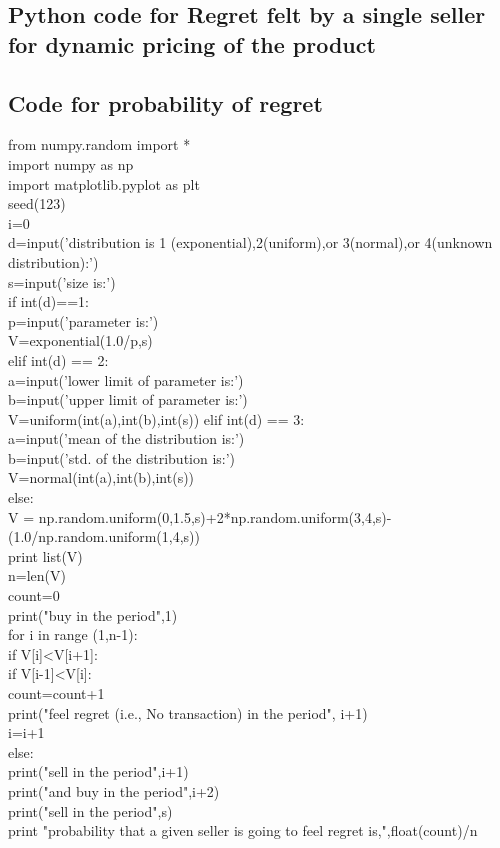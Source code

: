 \documentclass[10pt,a4paper,oneside]{report}
\begin{document}
\begin{appendix}
\chapter{Python code for Regret felt by a single seller for dynamic pricing of the product}
\begin{listing}
\label{ap_1}
\section{Code for probability of regret}
from numpy.random import *\\
import numpy as np\\ 
import matplotlib.pyplot as plt\\
seed(123)\\
i=0\\
d=input('distribution is 1 (exponential),2(uniform),or 3(normal),or 4(unknown distribution):')\\
s=input('size is:')\\
if int(d)==1:\\
    p=input('parameter is:')\\
    V=exponential(1.0/p,s)\\
elif int(d) == 2:\\
        a=input('lower limit of parameter is:')\\
        b=input('upper limit of parameter is:')\\
        V=uniform(int(a),int(b),int(s))
elif int(d) == 3:\\
        a=input('mean of the distribution is:')\\
        b=input('std. of the distribution is:')\\
        V=normal(int(a),int(b),int(s))\\
else:\\
    V = np.random.uniform(0,1.5,s)+2*np.random.uniform(3,4,s)-(1.0/np.random.uniform(1,4,s))\\
    print list(V)\\
n=len(V)\\
count=0\\
print("buy in the period",1)\\
for i in range (1,n-1):\\
    if V[i]<V[i+1]:\\
        if V[i-1]<V[i]:\\
            count=count+1\\
            print("feel regret (i.e., No transaction) in the period", i+1)\\
        i=i+1\\
    else:\\
        print("sell in the period",i+1)\\
        print("and buy in the period",i+2)\\
print("sell in the period",s)\\
print "probability that a given seller is going to feel regret is,",float(count)/n\\


\end{listing}
\end{appendix}
\end{document}
